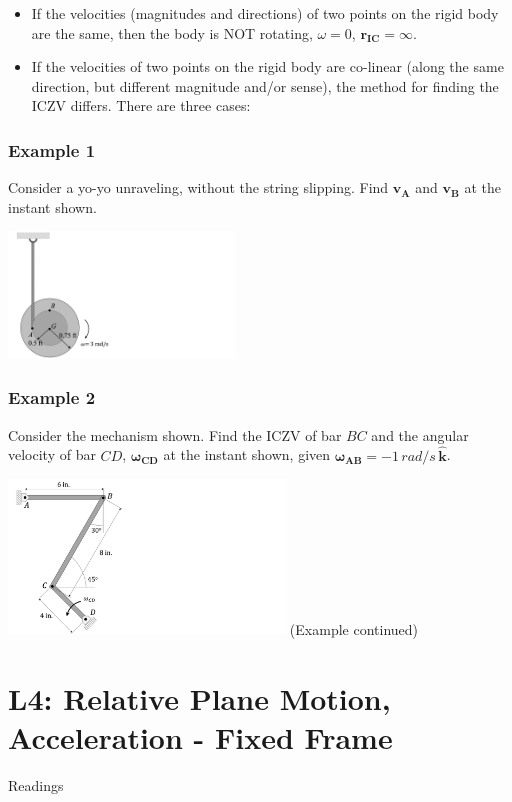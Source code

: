 \documentclass[12pt,letterpaper,twoside]{report}
\begin{document}
\begin{itemize}
\vspace*{4\baselineskip}

\item If the velocities (magnitudes and directions) of two points on the rigid body are the same, then the body is NOT rotating, $\omega = 0$, $\bm{r_{IC}} = \infty$.

\newpage
\item If the velocities of two points on the rigid body are co-linear (along the same direction, but different magnitude and/or sense), the method for finding the ICZV differs.  There are three cases: 
\end{itemize}

\newpage
\subsection{Example 1}
Consider a yo-yo unraveling, without the string slipping.  Find $\bm{v_A}$ and $\bm{v_B}$ at the instant shown.  

\includegraphics[trim={0cm 0cm 12cm 0cm},clip,width=0.45\textwidth, left]{Slide24} 
\newpage

\subsection{Example 2}
Consider the mechanism shown. Find the ICZV of bar $BC$ and the angular velocity of bar $CD$, $\bm{\omega_{CD}}$ at the instant shown, given $\bm{\omega_{AB}} = -1 \, rad/s \,  \bm{\hat{k}}$. 

\includegraphics[trim={0cm 0cm 12cm 0cm},clip,width=0.55\textwidth, left]{Slide25} 
\newpage
(Example continued)

\chapter{L4: Relative Plane Motion, Acceleration - Fixed Frame}
Readings
\end{document}
